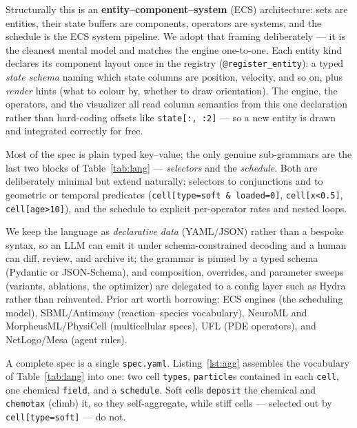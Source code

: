 \documentclass[11pt]{article}
\newcommand{\code}[1]{\texttt{#1}}
\begin{document}
Structurally this is an \textbf{entity--component--system} (ECS) architecture: sets
are entities, their state buffers are components, operators are systems, and the
schedule is the ECS system pipeline. We adopt that framing deliberately --- it is
the cleanest mental model and matches the engine one-to-one. Each entity kind
declares its component layout once in the registry (\code{@register\_entity}): a
typed \emph{state schema} naming which state columns are position, velocity, and
so on, plus \emph{render} hints (what to colour by, whether to draw orientation).
The engine, the operators, and the visualizer all read column semantics from this
one declaration rather than hard-coding offsets like \code{state[:, :2]} ---
so a new entity is drawn and integrated correctly for free.

Most of the spec is plain typed key--value; the only genuine sub-grammars are the
last two blocks of Table~\ref{tab:lang} --- \emph{selectors} and the
\emph{schedule}. Both are deliberately minimal but extend naturally: selectors to
conjunctions and to geometric or temporal predicates (\code{cell[type=soft \& loaded=0]},
\code{cell[x<0.5]}, \code{cell[age>10]}), and the schedule to explicit per-operator
rates and nested loops.

We keep the language as \emph{declarative data} (YAML/JSON) rather than a bespoke
syntax, so an LLM can emit it under schema-constrained decoding and a human can
diff, review, and archive it; the grammar is pinned by a typed schema (Pydantic or
JSON-Schema), and composition, overrides, and parameter sweeps (variants, ablations,
the optimizer) are delegated to a config layer such as Hydra rather than reinvented.
Prior art worth borrowing: ECS engines (the scheduling model), SBML/Antimony
(reaction--species vocabulary), NeuroML and MorpheusML/PhysiCell (multicellular
specs), UFL (PDE operators), and NetLogo/Mesa (agent rules).

A complete spec is a single \code{spec.yaml}. Listing~\ref{lst:agg} assembles the
vocabulary of Table~\ref{tab:lang} into one: two cell \code{types},
\code{particle}s contained in each \code{cell}, one chemical \code{field}, and a
\code{schedule}. Soft cells \code{deposit} the chemical and \code{chemotax} (climb)
it, so they self-aggregate, while stiff cells --- selected out by
\code{cell[type=soft]} --- do not.
\end{document}

